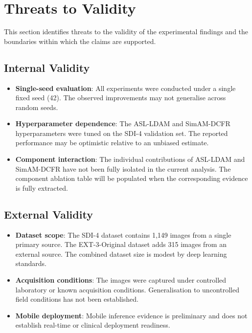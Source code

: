 
\section{Threats to Validity}
\label{sec:threats}

This section identifies threats to the validity of the experimental findings and the boundaries within which the claims are supported.

\subsection{Internal Validity}
\label{sec:internal-validity}

\begin{itemize}
    \item \textbf{Single-seed evaluation}: All experiments were conducted under a single fixed seed (42). The observed improvements may not generalise across random seeds.
    \item \textbf{Hyperparameter dependence}: The ASL-LDAM and SimAM-DCFR hyperparameters were tuned on the SDI-4 validation set. The reported performance may be optimistic relative to an unbiased estimate.
    \item \textbf{Component interaction}: The individual contributions of ASL-LDAM and SimAM-DCFR have not been fully isolated in the current analysis. The component ablation table will be populated when the corresponding evidence is fully extracted.
\end{itemize}

\subsection{External Validity}
\label{sec:external-validity}

\begin{itemize}
    \item \textbf{Dataset scope}: The SDI-4 dataset contains 1,149 images from a single primary source. The EXT-3-Original dataset adds 315 images from an external source. The combined dataset size is modest by deep learning standards.
    \item \textbf{Acquisition conditions}: The images were captured under controlled laboratory or known acquisition conditions. Generalisation to uncontrolled field conditions has not been established.
    \item \textbf{Mobile deployment}: Mobile inference evidence is preliminary and does not establish real-time or clinical deployment readiness.
\end{itemize}

